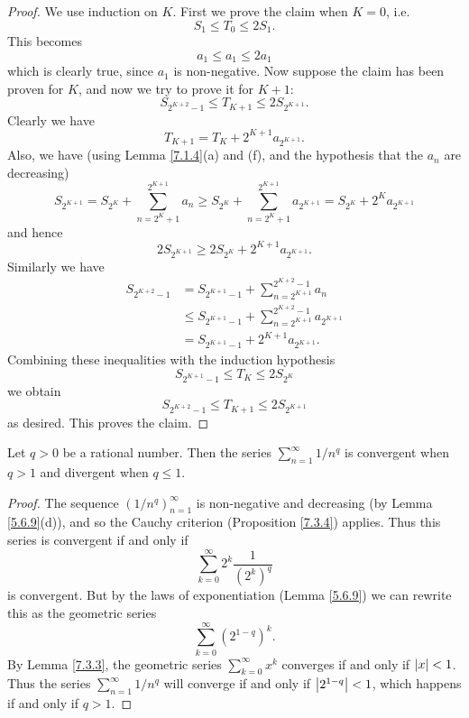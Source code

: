 \begin{proof}
    We use induction on \(K\).
    First we prove the claim when \(K = 0\), i.e.
    \[
        S_1 \leq T_0 \leq 2S_1.
    \]
    This becomes
    \[
        a_1 \leq a_1 \leq 2a_1
    \]
    which is clearly true, since \(a_1\) is non-negative.
    Now suppose the claim has been proven for \(K\), and now we try to prove it for \(K + 1\):
    \[
        S_{2^{K + 2} - 1} \leq T_{K + 1} \leq 2S_{2^{K + 1}}.
    \]
    Clearly we have
    \[
        T_{K + 1} = T_K + 2^{K + 1} a_{2^{K + 1}}.
    \]
    Also, we have
    (using Lemma \ref{7.1.4}(a) and (f), and the hypothesis that the \(a_n\) are decreasing)
    \[
        S_{2^{K + 1}} = S_{2^K} + \sum_{n = 2^K + 1}^{2^{K + 1}} a_n \geq S_{2^K} + \sum_{n = 2^K + 1}^{2^{K + 1}} a_{2^{K + 1}} = S_{2^K} + 2^K a_{2^{K + 1}}
    \]
    and hence
    \[
        2S_{2^{K + 1}} \geq 2S_{2^K} + 2^{K + 1} a_{2^{K + 1}}.
    \]
    Similarly we have
    \begin{align*}
        S_{2^{K + 2} - 1} & = S_{2^{K + 1} - 1} + \sum_{n = 2^{K + 1}}^{2^{K + 2} - 1} a_n              \\
                          & \leq S_{2^{K + 1} - 1} + \sum_{n = 2^{K + 1}}^{2^{K + 2} - 1} a_{2^{K + 1}} \\
                          & = S_{2^{K + 1} - 1} + 2^{K + 1} a_{2^{K + 1}}.
    \end{align*}
    Combining these inequalities with the induction hypothesis
    \[
        S_{2^{K + 1} - 1} \leq T_K \leq 2S_{2^K}
    \]
    we obtain
    \[
        S_{2^{K + 2} - 1} \leq T_{K + 1} \leq 2S_{2^{K + 1}}
    \]
    as desired.
    This proves the claim.
\end{proof}

\begin{corollary}\label{7.3.7}
    Let \(q > 0\) be a rational number.
    Then the series \(\sum_{n = 1}^\infty 1 / n^q\) is convergent when \(q > 1\) and divergent when \(q \leq 1\).
\end{corollary}

\begin{proof}
    The sequence \((1 / n^q)_{n = 1}^\infty\) is non-negative and decreasing (by Lemma \ref{5.6.9}(d)), and so the Cauchy criterion (Proposition \ref{7.3.4}) applies.
    Thus this series is convergent if and only if
    \[
        \sum_{k = 0}^\infty 2^k \frac{1}{(2^k)^q}
    \]
    is convergent.
    But by the laws of exponentiation (Lemma \ref{5.6.9}) we can rewrite this as the geometric series
    \[
        \sum_{k = 0}^\infty (2^{1 - q})^k.
    \]
    By Lemma \ref{7.3.3}, the geometric series \(\sum_{k = 0}^\infty x^k\) converges if and only if \(\abs*{x} < 1\).
    Thus the series \(\sum_{n = 1}^\infty 1 / n^q\) will converge if and only if \(\abs*{2^{1 - q}} < 1\), which happens if and only if \(q > 1\).
\end{proof}

